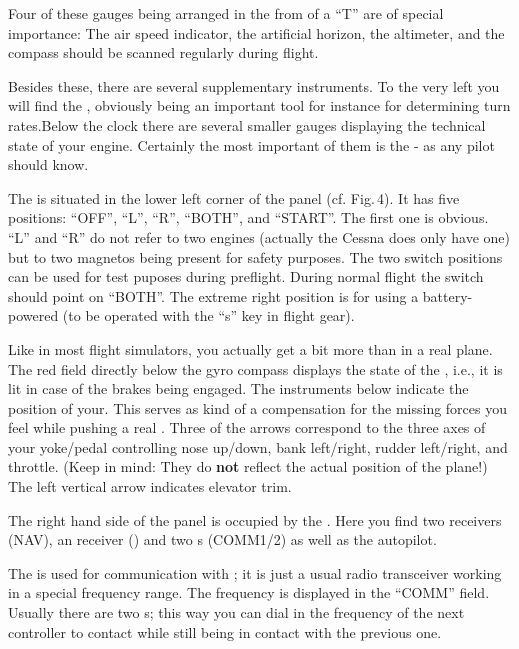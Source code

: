 Four of these gauges being arranged in the from of a ``T'' are of special
importance: The
air speed indicator, the artificial horizon, the altimeter, and the compass
should be
scanned regularly during flight.

Besides these, there are several supplementary instruments. To the very
left you will find the , obviously being an important tool
for instance for determining turn rates.Below the clock there are
several smaller gauges displaying the technical state of your engine.
Certainly the most important of them is the  - as
any pilot should know.

The  is situated in the lower left corner of the
panel (cf. Fig.\,4). It has five positions: ``OFF'', ``L'', ``R'',
``BOTH'', and ``START''. The first one is obvious. ``L'' and ``R'' do
not refer to two engines (actually the Cessna does only have one) but
to two magnetos being present for safety purposes. The two switch
positions can be used for test puposes during preflight. During normal
flight the switch should point on ``BOTH''. The extreme right position
is for  using a battery-powered
 (to be operated with the ``s'' key in flight gear).

Like in most flight simulators, you actually get a bit more than in a
real plane. The red field directly below the gyro compass displays the
state of the , i.e., it is lit in case of the brakes
being engaged. The instruments below indicate the position of
your. This serves as kind of a compensation for the missing
forces you feel while pushing a real . Three of the arrows
correspond to the three axes of your yoke/pedal controlling nose
up/down, bank left/right, rudder left/right, and throttle. (Keep in
mind: They do \textbf{not} reflect the actual position of the plane!)
The left vertical arrow indicates elevator trim.

The right hand side of the panel is occupied by the . Here
you find
two  receivers (NAV), an  receiver
() and two s
(COMM1/2) as
well as the autopilot.

The  is used for communication with ; it is just a usual radio transceiver working in a special frequency
range.
The frequency is displayed in the ``COMM'' field. Usually there are two
s; this way you can dial in the frequency of the next controller to
contact
while still being in contact with the previous one.

